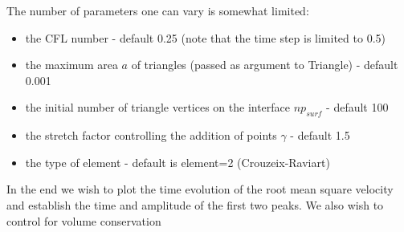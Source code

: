 The number of parameters one can vary is somewhat limited:
\begin{itemize}
\item the CFL number - default 0.25 (note that the time step is limited to 0.5)
\item the maximum area $a$ of triangles (passed as argument to Triangle) - default 0.001
\item the initial number of triangle vertices on the interface $np_{surf}$ - default 100
\item the stretch factor controlling the addition of points $\gamma$ - default 1.5
\item the type of element - default is element=2 (Crouzeix-Raviart)
\end{itemize}

In the end we wish to plot the time evolution of the root mean square velocity and 
establish the time and amplitude of the first two peaks. We also wish to control 
for volume conservation 


